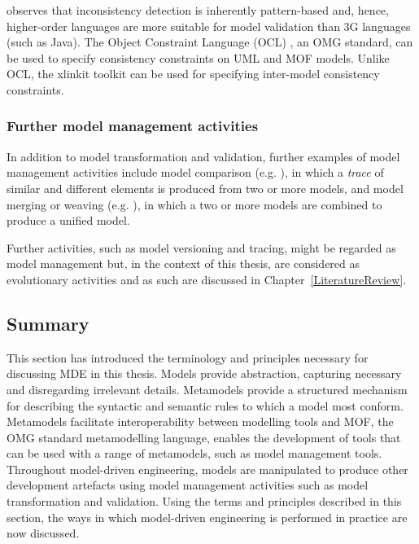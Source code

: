 \cite{kolovos09thesis} observes that inconsistency detection is inherently pattern-based and, hence, higher-order languages are more suitable for model validation than 3G languages (such as Java). The Object Constraint Language (OCL) \cite{ocl2}, an OMG standard, can be used to specify consistency constraints on UML and MOF models. Unlike OCL, the xlinkit toolkit \cite{nentwich2003flexible} can be used for specifying inter-model consistency constraints. 

\subsubsection{Further model management activities}
In addition to model transformation and validation, further examples of model management activities include model comparison (e.g. \cite{kolovos06ecl}), in which a \emph{trace} of similar and different elements is produced from two or more models, and model merging or weaving (e.g. \cite{kolovos07eml}), in which a two or more models are combined to produce a unified model.

Further activities, such as model versioning and tracing, might be regarded as model management but, in the context of this thesis, are considered as evolutionary activities and as such are discussed in Chapter~\ref{LiteratureReview}.

\subsection{Summary}
This section has introduced the terminology and principles necessary for discussing MDE in this thesis. Models provide abstraction, capturing necessary and disregarding irrelevant details. Metamodels provide a structured mechanism for describing the syntactic and semantic rules to which a model most conform. Metamodels facilitate interoperability between modelling tools and MOF, the OMG standard metamodelling language, enables the development of tools that can be used with a range of metamodels, such as model management tools. Throughout model-driven engineering, models are manipulated to produce other development artefacts using model management activities such as model transformation and validation. Using the terms and principles described in this section, the ways in which model-driven engineering is performed in practice are now discussed.